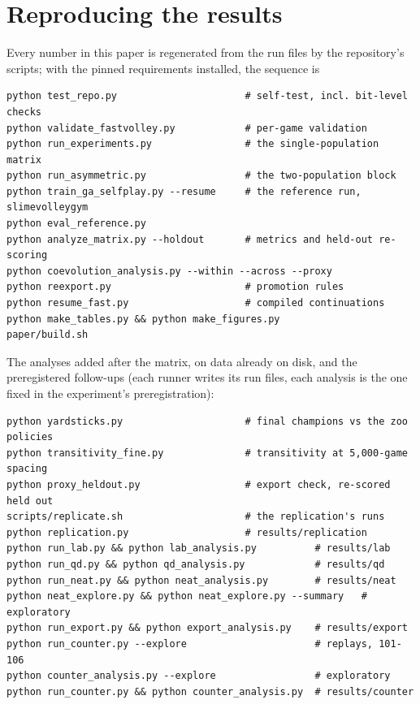 \documentclass[11pt]{article}
\begin{document}
\begin{table}[!htbp]
\centering\small
\caption{Continuations of the reference run's population snapshot.}
\label{tab:resume}

\end{table}

\FloatBarrier
\section{Reproducing the results}
\label{app:repro}

Every number in this paper is regenerated from the run files by the
repository's scripts; with the pinned requirements installed, the sequence is

\begin{small}
\begin{verbatim}
python test_repo.py                      # self-test, incl. bit-level checks
python validate_fastvolley.py            # per-game validation
python run_experiments.py                # the single-population matrix
python run_asymmetric.py                 # the two-population block
python train_ga_selfplay.py --resume     # the reference run, slimevolleygym
python eval_reference.py
python analyze_matrix.py --holdout       # metrics and held-out re-scoring
python coevolution_analysis.py --within --across --proxy
python reexport.py                       # promotion rules
python resume_fast.py                    # compiled continuations
python make_tables.py && python make_figures.py
paper/build.sh
\end{verbatim}
\end{small}

\noindent The analyses added after the matrix, on data already on disk, and
the preregistered follow-ups (each runner writes its run files, each analysis
is the one fixed in the experiment's preregistration):

\begin{small}
\begin{verbatim}
python yardsticks.py                     # final champions vs the zoo policies
python transitivity_fine.py              # transitivity at 5,000-game spacing
python proxy_heldout.py                  # export check, re-scored held out
scripts/replicate.sh                     # the replication's runs
python replication.py                    # results/replication
python run_lab.py && python lab_analysis.py          # results/lab
python run_qd.py && python qd_analysis.py            # results/qd
python run_neat.py && python neat_analysis.py        # results/neat
python neat_explore.py && python neat_explore.py --summary   # exploratory
python run_export.py && python export_analysis.py    # results/export
python run_counter.py --explore                      # replays, 101-106
python counter_analysis.py --explore                 # exploratory
python run_counter.py && python counter_analysis.py  # results/counter
\end{verbatim}
\end{small}
\end{document}
